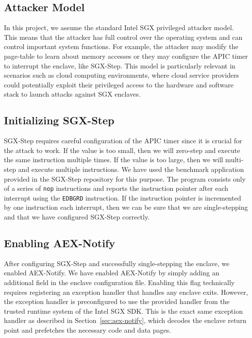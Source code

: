 \documentclass{llncs}
\begin{document}
\subsection{Attacker Model}

In this project, we assume the standard Intel SGX privileged attacker model.
This means that the attacker has full control over the operating system
and can control important system functions.
For example, the attacker may modify the page-table to learn about memory accesses
or they may configure the APIC timer to interrupt the enclave, like SGX-Step.
This model is particularly relevant in scenarios such as cloud computing
environments, where cloud service providers could potentially exploit their
privileged access to the hardware and software stack to launch attacks against SGX enclaves.

\subsection{Initializing SGX-Step}


SGX-Step requires careful configuration of the APIC timer
since it is crucial for the attack to work.
If the value is too small, then we will zero-step and execute the same instruction multiple times.
If the value is too large, then we will multi-step and execute multiple instructions.
We have used the benchmark application provided in the SGX-Step repository for this purpose.
The program consists only of a series of \texttt{nop} instructions and
reports the instruction pointer after each interrupt using the \texttt{EDBGRD} instruction.
If the instruction pointer is incremented by one instruction each interrupt,
then we can be sure that we are single-stepping and
that we have configured SGX-Step correctly.

\subsection{Enabling AEX-Notify}

After configuring SGX-Step and successfully single-stepping the enclave,
we enabled AEX-Notify.
We have enabled AEX-Notify by simply adding an additional field in the enclave configuration file.
Enabling this flag technically requires registering an exception handler that handles any enclave exits.
However, the exception handler is preconfigured to use the provided handler
from the trusted runtime system of the Intel SGX SDK.
This is the exact same exception handler as described in Section~\ref{sec:aex-notify},
which decodes the enclave return point and prefetches the necessary code and data pages.
\end{document}
